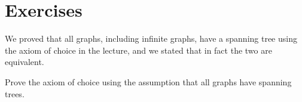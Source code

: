 \documentclass[nobib]{tufte-handout}
\begin{document}
\begin{theorem}
  
\end{theorem}

\section{Exercises}

\begin{xca}
  We proved that all graphs, including infinite graphs, have a spanning tree using the axiom of choice in the lecture, and we stated that in fact the two are equivalent.

  Prove the axiom of choice using the assumption that all graphs have spanning trees.
\end{xca}
%
%
\end{document}

